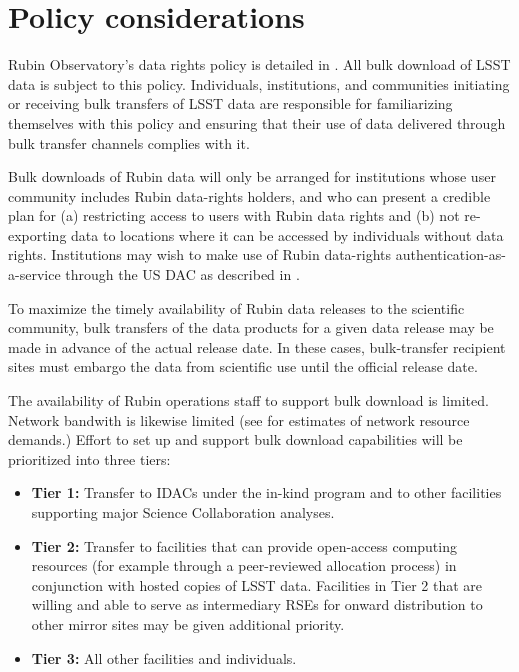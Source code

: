 \section{Policy considerations}

Rubin Observatory's data rights policy is detailed in . All bulk download of LSST data is subject to this policy. Individuals, institutions, and communities initiating or receiving bulk transfers of LSST data are responsible for familiarizing themselves with this policy and ensuring that their use of data delivered through bulk transfer channels complies with it.

Bulk downloads of Rubin data will only be arranged for institutions whose user community includes Rubin data-rights holders, and who can present a credible plan for (a) restricting access to users with Rubin data rights and (b) not re-exporting data to locations where it can be accessed by individuals without data rights. Institutions may wish to make use of Rubin data-rights authentication-as-a-service through the US DAC as described in .

To maximize the timely availability of Rubin data releases to the scientific community, bulk transfers of the data products for a given data release may be made in advance of the actual release date. In these cases, bulk-transfer recipient sites must embargo the data from scientific use until the official release date.

The availability of Rubin operations staff to support bulk download is limited. Network bandwith is likewise limited (see  for estimates of network resource demands.) Effort to set up and support bulk download capabilities will be prioritized into three tiers:
\begin{itemize}
\item \textbf{Tier 1:} Transfer to IDACs under the in-kind program and to other facilities supporting major Science Collaboration analyses.
\item \textbf{Tier 2:} Transfer to facilities that can provide open-access computing resources (for example through a peer-reviewed allocation process) in conjunction with hosted copies of LSST data. Facilities in Tier 2 that are willing and able to serve as intermediary RSEs for onward distribution to other mirror sites may be given additional priority.
\item \textbf{Tier 3:} All other facilities and individuals.
\end{itemize}

